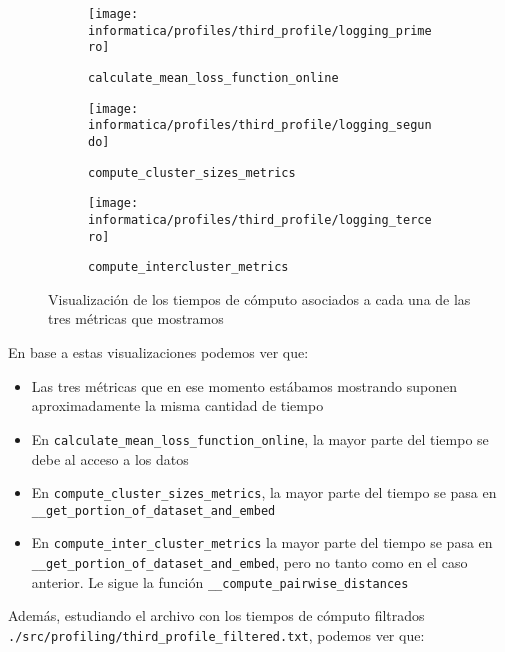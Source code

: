 \begin{figure}[H]
\centering
    \begin{subfigure}{.5\textwidth}
        \centering
        \texttt{[image: informatica/profiles/third\_profile/logging\_primero]}
        \caption{\lstinline{calculate_mean_loss_function_online}}
    \end{subfigure}%
    \begin{subfigure}{.5\textwidth}
        \centering
        \texttt{[image: informatica/profiles/third\_profile/logging\_segundo]}
        \caption{\lstinline{compute_cluster_sizes_metrics}}
    \end{subfigure}

    \begin{subfigure}{.7\textwidth}
        \centering
        \texttt{[image: informatica/profiles/third\_profile/logging\_tercero]}
        \caption{\lstinline{compute_intercluster_metrics}}
    \end{subfigure}
\caption{Visualización de los tiempos de cómputo asociados a cada una de las tres métricas que mostramos}
\end{figure}

En base a estas visualizaciones podemos ver que:

\begin{sloppypar}
\begin{itemize}
    \item Las tres métricas que en ese momento estábamos mostrando suponen aproximadamente la misma cantidad de tiempo
    \item En \lstinline{calculate_mean_loss_function_online}, la mayor parte del tiempo se debe al acceso a los datos
    \item En \lstinline{compute_cluster_sizes_metrics}, la mayor parte del tiempo se pasa en \lstinline{__get_portion_of_dataset_and_embed}
    \item En \lstinline[breaklines=true]{compute_inter_cluster_metrics} la mayor parte del tiempo se pasa en \lstinline[breaklines=true]{__get_portion_of_dataset_and_embed}, pero no tanto como en el caso anterior. Le sigue la función \lstinline{__compute_pairwise_distances}
\end{itemize}
\end{sloppypar}

Además, estudiando el archivo con los tiempos de cómputo filtrados \lstinline{./src/profiling/third_profile_filtered.txt}, podemos ver que:

